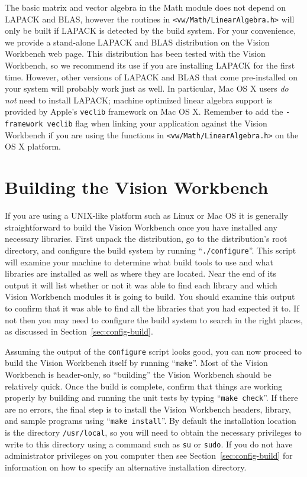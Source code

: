 The basic matrix and vector algebra in the Math module does not depend
on LAPACK and BLAS, however the routines in
\verb#<vw/Math/LinearAlgebra.h># will only be built if LAPACK is
detected by the build system.  For your convenience, we provide a
stand-alone LAPACK and BLAS distribution on the Vision Workbench web
page.  This distribution has been tested with the Vision Workbench, so
we recommend its use if you are installing LAPACK for the first time.
However, other versions of LAPACK and BLAS that come pre-installed on
your system will probably work just as well.  In particular, Mac OS X
users {\em do not} need to install LAPACK; machine optimized linear
algebra support is provided by Apple's \verb#veclib# framework on Mac
OS X.  Remember to add the \verb#-framework veclib# flag when linking
your application against the Vision Workbench if you are using the
functions in \verb#<vw/Math/LinearAlgebra.h># on the OS X platform.

\section{Building the Vision Workbench}

If you are using a UNIX-like platform such as Linux or Mac OS it is
generally straightforward to build the Vision Workbench once you have
installed any necessary libraries.  First unpack the distribution, go
to the distribution's root directory, and configure the build system
by running ``\verb#./configure#''.  This script will examine your machine
to determine what build tools to use and what libraries are installed
as well as where they are located.  Near the end of its output it will
list whether or not it was able to find each library and which Vision
Workbench modules it is going to build.  You should examine this
output to confirm that it was able to find all the libraries that you
had expected it to.  If not then you may need to configure the build
system to search in the right places, as discussed in
Section~\ref{sec:config-build}.

Assuming the output of the \verb#configure# script looks good, you can
now proceed to build the Vision Workbench itself by running
``\verb#make#''.  Most of the Vision Workbench is header-only, so
``building'' the Vision Workbench should be relatively quick. Once
the build is complete, confirm that things are working properly by
building and running the unit tests by typing ``\verb#make check#''.
If there are no errors, the final step is to install the Vision
Workbench headers, library, and sample programs using
``\verb#make install#''.  By default the installation location is the
directory \verb#/usr/local#, so you will need to obtain the necessary
privileges to write to this directory using a command such as
\verb#su# or \verb#sudo#.  If you do not have administrator privileges
on you computer then see Section~\ref{sec:config-build} for
information on how to specify an alternative installation directory.

